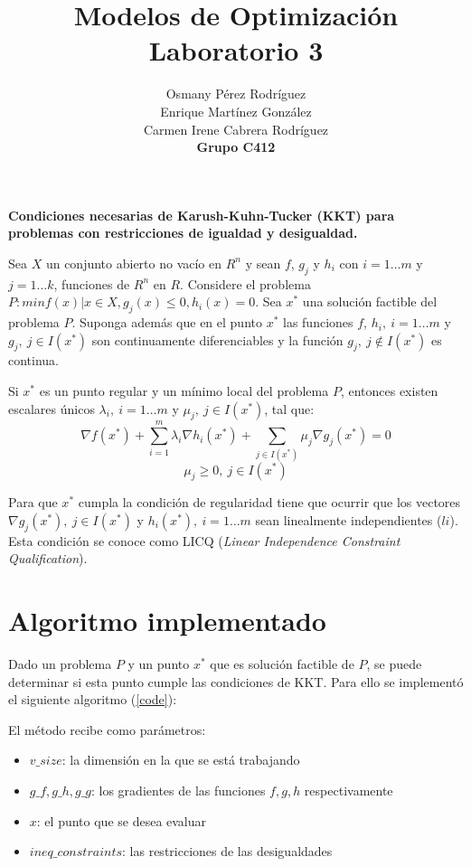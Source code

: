 \documentclass[titlepage, 11pt]{scrartcl}
\title{
    \normalfont\normalsize
    {\huge Modelos de Optimización\\
    		\textbf{Laboratorio 3}}
    \vspace{12pt}
}
\author{Osmany P\'erez Rodr\'iguez\\
		Enrique Mart\'inez Gonz\'alez\\
		Carmen Irene Cabrera Rodr\'iguez\\
		\textbf{Grupo C412}}
\date{}
\begin{document}
    \maketitle 
    
	\textbf{Condiciones necesarias de Karush-Kuhn-Tucker (KKT) para problemas con restricciones de igualdad y desigualdad.}
	
	Sea $X$ un conjunto abierto no vacío en $R^n$ y sean $f$, $g_j$ y $h_i$ con $i = 1 \ldots m$ y $j = 1\ldots k$, funciones de $R^n$ en $R$. Considere el problema $P: min{f(x) | x \in X, g_j(x) \leq 0, h_i(x) = 0}$. Sea $x^*$ una solución factible del problema $P$. Suponga además que en el punto $x^*$ las funciones $f$, $h_i , \ i = 1 \ldots m$ y $g_j, \ j \in I(x^*)$ son continuamente diferenciables y la función $g_j, \ j\notin I(x^*)$ es continua.
	
	Si $x^*$ es un punto regular y un mínimo local del problema $P$, entonces existen escalares únicos $\lambda_i, \ i = 1 \ldots m$ y $\mu_j, \ j \in I(x^*)$, tal que:
	\begin{equation*}
		\nabla f(x^*) + \sum_{i = 1}^{m}\lambda_i \nabla h_i(x^*) + \sum_{j \in I(x^*)}\mu_j \nabla g_j(x^*) = 0
	\end{equation*}
	\begin{equation*}
		\mu_j \geq 0, \ j \in I(x^*)
	\end{equation*}
	
	\vspace{5mm}
	Para que $x^*$ cumpla la condici\'on de regularidad tiene que ocurrir que los vectores $\nabla g_j(x^*), \ j \in I(x^*)$ y $h_i(x^*), \ i = 1 \ldots m$ sean linealmente independientes ($li$). Esta condici\'on se conoce como LICQ (\textit{Linear Independence Constraint Qualification}).
	\vspace{1cm}
	\section{Algoritmo implementado}
	
	Dado un problema $P$ y un punto $x^*$ que es solución factible de $P$, se puede determinar si esta punto cumple las condiciones de KKT. Para ello se implement\'o el siguiente algoritmo (\ref{code}):
	
	El método recibe como parámetros:
	\begin{itemize}
		\item $v\_size$: la dimensión en la que se está trabajando
		\item $g\_f, g\_h, g\_g$: los gradientes de las funciones $f, g, h$ respectivamente
		\item $x$: el punto que se desea evaluar
		\item $ineq\_constraints$: las restricciones de las desigualdades
	\end{itemize}
	
\end{document}
